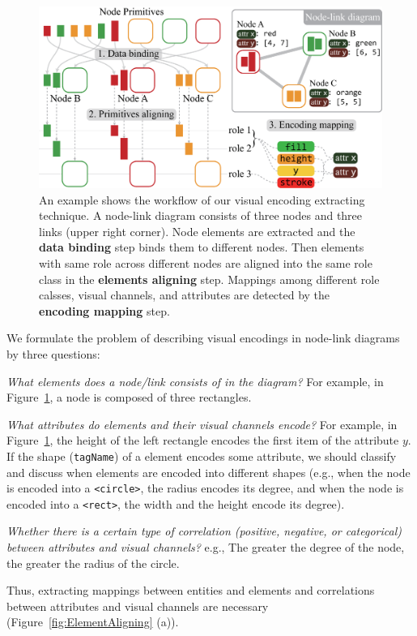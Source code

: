 \begin{figure}[ht]
    \centering
    \includegraphics[width=1\columnwidth]{figures/VisualEncodings.eps}
    \caption{An example shows the workflow of our visual encoding extracting technique. A node-link diagram consists of three nodes and three links (upper right corner). Node elements are extracted and the \textbf {data binding} step binds them to different nodes. Then elements with same role across different nodes are aligned into the same role class in the \textbf{elements aligning} step. Mappings among different role calsses, visual channels, and attributes are detected by the \textbf{encoding mapping} step.}
    \label{fig:VisualEncodings}
\end{figure}

We formulate the problem of describing visual encodings in node-link diagrams by three questions:
\begin{compactenum}[\textbf{Q}1]
    \item \textit{What elements does a node/link consists of in the diagram?} For example, in Figure~\ref{fig:VisualEncodings}, a node is composed of three rectangles. \label{qstn:composition}
    
    \item \textit{What attributes do elements and their visual channels encode?} For example, in Figure~\ref{fig:VisualEncodings}, the height of the left rectangle encodes the first item of the attribute $y$. If the shape (\texttt{tagName}) of a element encodes some attribute, we should classify and discuss when elements are encoded into different shapes (e.g., when the node is encoded into a \texttt{<circle>}, the radius encodes its degree, and when the node is encoded into a \texttt{<rect>}, the width and the height encode its degree). \label{qstn:encodings}
    
    \item \textit{Whether there is a certain type of correlation (positive, negative, or categorical) between attributes and visual channels?} e.g., The greater the degree of the node, the greater the radius of the circle.\label{qstn:correlation}
\end{compactenum}
Thus, extracting mappings between entities and elements and correlations between attributes and visual channels are necessary (Figure~\ref{fig:ElementAligning} (a)).


